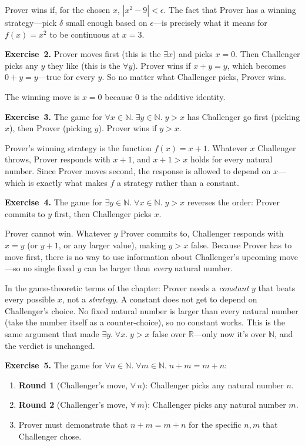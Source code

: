 \documentclass[11pt]{article}
\begin{document}
Prover wins if, for the chosen $x$, $|x^2 - 9| < \epsilon$.  The fact
that Prover has a winning strategy---pick $\delta$ small enough based
on $\epsilon$---is precisely what it means for $f(x) = x^2$ to be
continuous at $x = 3$.

\medskip
\textbf{Exercise~2.}
Prover moves first (this is the $\exists x$) and picks $x = 0$.
Then Challenger picks any $y$ they like (this is the $\forall y$).
Prover wins if $x + y = y$, which becomes $0 + y = y$---true for every
$y$.  So no matter what Challenger picks, Prover wins.

The winning move is $x = 0$ because $0$ is the additive identity.

\medskip
\textbf{Exercise~3.}
The game for $\forall x \in \mathbb{N}.\; \exists y \in \mathbb{N}.\; y > x$ has Challenger go first (picking $x$), then Prover (picking $y$). Prover wins if $y > x$.

Prover's winning strategy is the function $f(x) = x + 1$. Whatever $x$ Challenger throws, Prover responds with $x + 1$, and $x + 1 > x$ holds for every natural number. Since Prover moves second, the response is allowed to depend on $x$---which is exactly what makes $f$ a strategy rather than a constant.

\medskip
\textbf{Exercise~4.}
The game for $\exists y \in \mathbb{N}.\; \forall x \in \mathbb{N}.\; y > x$ reverses the order: Prover commits to $y$ first, then Challenger picks $x$.

Prover cannot win. Whatever $y$ Prover commits to, Challenger responds with $x = y$ (or $y + 1$, or any larger value), making $y > x$ false. Because Prover has to move first, there is no way to use information about Challenger's upcoming move---so no single fixed $y$ can be larger than \emph{every} natural number.

In the game-theoretic terms of the chapter: Prover needs a
\emph{constant} $y$ that beats every possible $x$, not a
\emph{strategy}.  A constant does not get to depend on Challenger's
choice.  No fixed natural number is larger than every natural number
(take the number itself as a counter-choice), so no constant works.
This is the same argument that made $\exists y.\; \forall x.\; y > x$
false over $\mathbb{R}$---only now it's over $\mathbb{N}$, and the
verdict is unchanged.

\medskip
\textbf{Exercise~5.}
The game for $\forall n \in \mathbb{N}.\; \forall m \in \mathbb{N}.\;
n + m = m + n$:

\begin{enumerate}
  \item \textbf{Round 1} (Challenger's move, $\forall\, n$): Challenger
        picks any natural number $n$.
  \item \textbf{Round 2} (Challenger's move, $\forall\, m$): Challenger
        picks any natural number $m$.
  \item Prover must demonstrate that $n + m = m + n$ for the specific
        $n, m$ that Challenger chose.
\end{enumerate}
\end{document}
